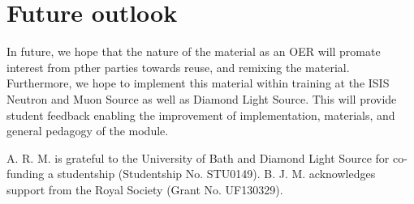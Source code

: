 \documentclass[amsmath,amssymb,twocolumn,superscriptaddress,aps,prl]{revtex4-1}
\begin{document}
\section{Future outlook}

In future, we hope that the nature of the material as an OER will promate interest from pther parties towards reuse, and remixing the material.
Furthermore, we hope to implement this material within training at the ISIS Neutron and Muon Source as well as Diamond Light Source. 
This will provide student feedback enabling the improvement of implementation, materials, and general pedagogy of the module. 

\begin{acknowledgements}
A. R. M. is grateful to the University of Bath and Diamond Light Source for co-funding a studentship (Studentship No. STU0149).
B. J. M. acknowledges support from the Royal Society (Grant No. UF130329).
\end{acknowledgements}


\end{document}

